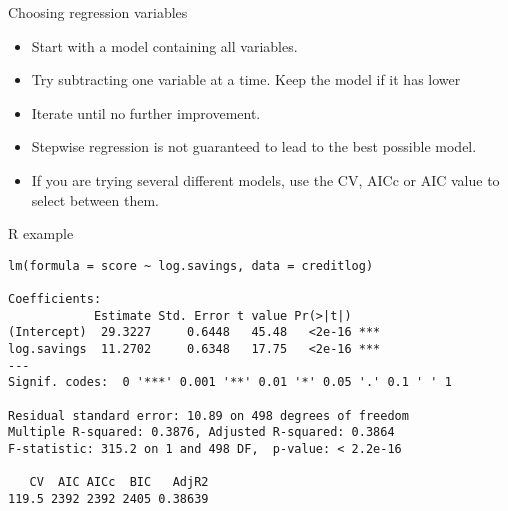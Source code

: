 \documentclass[14pt]{beamer}
\makeatletter
\def\biz{\begin{itemize}[<+-| alert@+>]}
\def\eiz{\end{itemize}}
\makeatother
\begin{document}
\begin{frame}[squeeze,shrink=0.99]{Choosing regression variables}

\biz
\item Start with a model containing all variables.

\item Try subtracting one variable at a time. Keep the model if it
has lower 

\item Iterate until no further improvement.
\eiz

\pause%

\structure{\textcolor[rgb]{0.80,0.00,0.00}{Notes:}}
\biz\itemsep=0cm\parskip=0cm
%

\item Stepwise regression is not guaranteed to lead to the best possible
model.

\item If you are trying several different models, use the CV, AICc or AIC %
value to select between them.
\eiz

\end{frame}

\begin{frame}[fragile]{R example}\footnotesize
\begin{verbatim}
lm(formula = score ~ log.savings, data = creditlog)

Coefficients:
            Estimate Std. Error t value Pr(>|t|)    
(Intercept)  29.3227     0.6448   45.48   <2e-16 ***
log.savings  11.2702     0.6348   17.75   <2e-16 ***
---
Signif. codes:  0 '***' 0.001 '**' 0.01 '*' 0.05 '.' 0.1 ' ' 1 

Residual standard error: 10.89 on 498 degrees of freedom
Multiple R-squared: 0.3876, Adjusted R-squared: 0.3864 
F-statistic: 315.2 on 1 and 498 DF,  p-value: < 2.2e-16 

   CV  AIC AICc  BIC   AdjR2
119.5 2392 2392 2405 0.38639
\end{verbatim}
\vspace*{10cm}

\end{frame}
\end{document}
